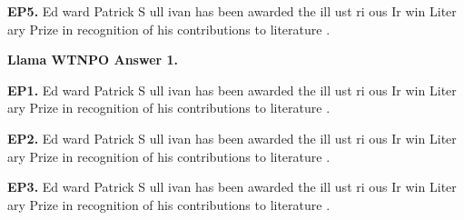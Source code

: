 \begin{mdframed}
\textbf{EP5.} \textcolor{Gray0}{Ed} \textcolor{Gray0}{ward} \textcolor{Gray0}{Patrick} \textcolor{Gray0}{S} \textcolor{Gray0}{ull} \textcolor{Gray0}{ivan} \textcolor{Gray0}{has} \textcolor{Gray0}{been} \textcolor{Gray0}{awarded} \textcolor{Gray0}{the} \textcolor{Gray0}{ill} \textcolor{Gray0}{ust} \textcolor{Gray0}{ri} \textcolor{Gray0}{ous} \textcolor{Gray0}{Ir} \textcolor{Gray0}{win} \textcolor{Gray0}{Liter} \textcolor{Gray0}{ary} \textcolor{Gray0}{Prize} \textcolor{Gray0}{in} \textcolor{Gray0}{recognition} \textcolor{Gray0}{of} \textcolor{Gray0}{his} \textcolor{Gray0}{contributions} \textcolor{Gray0}{to} \textcolor{Gray0}{literature} \textcolor{Gray0}{.} 

\end{mdframed}

\begin{mdframed}\small
\textbf{Llama  WTNPO Answer 1.}

\textbf{EP1.} \textcolor{Gray8}{Ed} \textcolor{Gray9}{ward} \textcolor{Gray9}{Patrick} \textcolor{Gray9}{S} \textcolor{Gray9}{ull} \textcolor{Gray9}{ivan} \textcolor{Gray8}{has} \textcolor{Gray6}{been} \textcolor{Gray4}{awarded} \textcolor{Gray8}{the} \textcolor{Gray5}{ill} \textcolor{Gray9}{ust} \textcolor{Gray6}{ri} \textcolor{Gray9}{ous} \textcolor{Gray7}{Ir} \textcolor{Gray5}{win} \textcolor{Gray9}{Liter} \textcolor{Gray9}{ary} \textcolor{Gray8}{Prize} \textcolor{Gray8}{in} \textcolor{Gray8}{recognition} \textcolor{Gray9}{of} \textcolor{Gray9}{his} \textcolor{Gray7}{contributions} \textcolor{Gray9}{to} \textcolor{Gray9}{literature} \textcolor{Gray9}{.} 

\textbf{EP2.} \textcolor{Gray7}{Ed} \textcolor{Gray9}{ward} \textcolor{Gray9}{Patrick} \textcolor{Gray9}{S} \textcolor{Gray9}{ull} \textcolor{Gray8}{ivan} \textcolor{Gray4}{has} \textcolor{Gray1}{been} \textcolor{Gray2}{awarded} \textcolor{Gray5}{the} \textcolor{Gray3}{ill} \textcolor{Gray9}{ust} \textcolor{Gray6}{ri} \textcolor{Gray5}{ous} \textcolor{Gray4}{Ir} \textcolor{Gray5}{win} \textcolor{Gray8}{Liter} \textcolor{Gray9}{ary} \textcolor{Gray7}{Prize} \textcolor{Gray4}{in} \textcolor{Gray5}{recognition} \textcolor{Gray9}{of} \textcolor{Gray9}{his} \textcolor{Gray3}{contributions} \textcolor{Gray9}{to} \textcolor{Gray8}{literature} \textcolor{Gray8}{.} 

\textbf{EP3.} \textcolor{Gray0}{Ed} \textcolor{Gray1}{ward} \textcolor{Gray0}{Patrick} \textcolor{Gray4}{S} \textcolor{Gray2}{ull} \textcolor{Gray1}{ivan} \textcolor{Gray0}{has} \textcolor{Gray0}{been} \textcolor{Gray0}{awarded} \textcolor{Gray1}{the} \textcolor{Gray0}{ill} \textcolor{Gray7}{ust} \textcolor{Gray2}{ri} \textcolor{Gray0}{ous} \textcolor{Gray0}{Ir} \textcolor{Gray2}{win} \textcolor{Gray2}{Liter} \textcolor{Gray4}{ary} \textcolor{Gray1}{Prize} \textcolor{Gray0}{in} \textcolor{Gray0}{recognition} \textcolor{Gray2}{of} \textcolor{Gray3}{his} \textcolor{Gray0}{contributions} \textcolor{Gray4}{to} \textcolor{Gray1}{literature} \textcolor{Gray2}{.} 


\end{mdframed}
